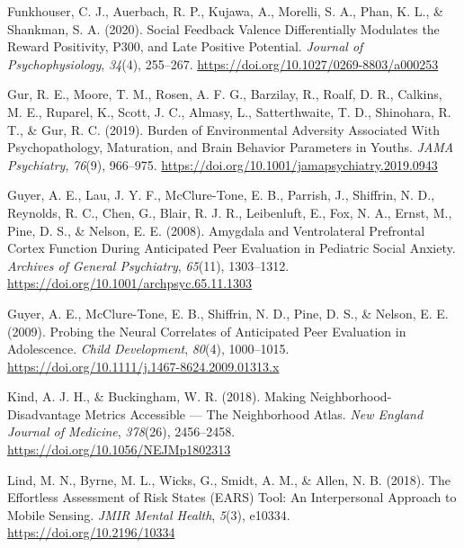 \documentclass[
  man]{apa7}
\newlength{\cslhangindent}
\newlength{\cslentryspacingunit} %
\newenvironment{CSLReferences}[2] %
 {%
  \setlength{\parindent}{0pt}
  \ifodd #1
  \let\oldpar\par
  \def\par{\hangindent=\cslhangindent\oldpar}
  \fi
  \setlength{\parskip}{#2\cslentryspacingunit}
 }%
 {}
\begin{document}
\begin{CSLReferences}{1}{0}
\leavevmode{}%
Funkhouser, C. J., Auerbach, R. P., Kujawa, A., Morelli, S. A., Phan, K. L., \& Shankman, S. A. (2020). Social {Feedback Valence Differentially Modulates} the {Reward Positivity}, {P300}, and {Late Positive Potential}. \emph{Journal of Psychophysiology}, \emph{34}(4), 255--267. \url{https://doi.org/10.1027/0269-8803/a000253}

\leavevmode{}%
Gur, R. E., Moore, T. M., Rosen, A. F. G., Barzilay, R., Roalf, D. R., Calkins, M. E., Ruparel, K., Scott, J. C., Almasy, L., Satterthwaite, T. D., Shinohara, R. T., \& Gur, R. C. (2019). Burden of {Environmental Adversity Associated With Psychopathology}, {Maturation}, and {Brain Behavior Parameters} in {Youths}. \emph{JAMA Psychiatry}, \emph{76}(9), 966--975. \url{https://doi.org/10.1001/jamapsychiatry.2019.0943}

\leavevmode{}%
Guyer, A. E., Lau, J. Y. F., McClure-Tone, E. B., Parrish, J., Shiffrin, N. D., Reynolds, R. C., Chen, G., Blair, R. J. R., Leibenluft, E., Fox, N. A., Ernst, M., Pine, D. S., \& Nelson, E. E. (2008). Amygdala and {Ventrolateral Prefrontal Cortex Function During Anticipated Peer Evaluation} in {Pediatric Social Anxiety}. \emph{Archives of General Psychiatry}, \emph{65}(11), 1303--1312. \url{https://doi.org/10.1001/archpsyc.65.11.1303}

\leavevmode{}%
Guyer, A. E., McClure-Tone, E. B., Shiffrin, N. D., Pine, D. S., \& Nelson, E. E. (2009). Probing the {Neural Correlates} of {Anticipated Peer Evaluation} in {Adolescence}. \emph{Child Development}, \emph{80}(4), 1000--1015. \url{https://doi.org/10.1111/j.1467-8624.2009.01313.x}

\leavevmode{}%
Kind, A. J. H., \& Buckingham, W. R. (2018). Making {Neighborhood-Disadvantage Metrics Accessible} --- {The Neighborhood Atlas}. \emph{New England Journal of Medicine}, \emph{378}(26), 2456--2458. \url{https://doi.org/10.1056/NEJMp1802313}

\leavevmode{}%
Lind, M. N., Byrne, M. L., Wicks, G., Smidt, A. M., \& Allen, N. B. (2018). The {Effortless Assessment} of {Risk States} ({EARS}) {Tool}: {An Interpersonal Approach} to {Mobile Sensing}. \emph{JMIR Mental Health}, \emph{5}(3), e10334. \url{https://doi.org/10.2196/10334}


\end{CSLReferences}
\end{document}
